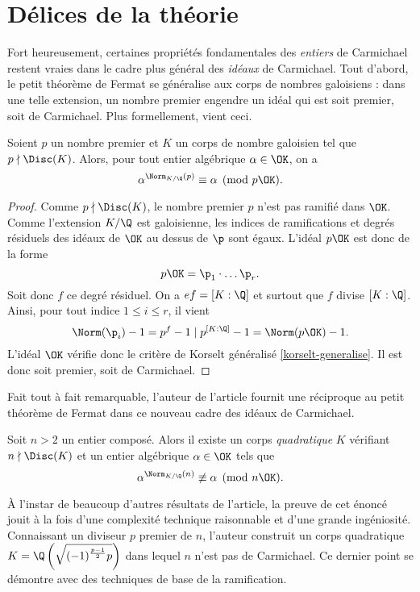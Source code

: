 \section{Délices de la théorie}

Fort heureusement, certaines propriétés fondamentales des \emph{entiers} de Carmichael restent vraies dans le cadre plus général des \emph{idéaux} de Carmichael. Tout d'abord, le petit théorème de Fermat se généralise aux corps de nombres galoisiens : dans une telle extension, un nombre premier engendre un idéal qui est soit premier, soit de Carmichael. Plus formellement, vient ceci.
\begin{theoreme}
	Soient $p$ un nombre premier et $K$ un corps de nombre galoisien tel que $p\nmid \Disc(K)$. Alors, pour tout entier algébrique $\alpha \in \OK$, on a $$\alpha^{\Norm_{K/\Q}(p)} \equiv \alpha \pmod{p\OK}.$$
\end{theoreme}

\begin{proof}
	Comme $p\nmid \Disc(K)$, le nombre premier $p$ n'est pas ramifié dans $\OK$. Comme l'extension $K/\Q$ est galoisienne, les indices de ramifications et degrés résiduels des idéaux de $\OK$ au dessus de $\p$ sont égaux. L'idéal $p\OK$ est donc de la forme \[p\OK = \p_1\cdot \dots \p_r.\] Soit donc $f$ ce degré résiduel. On a $ef = [K : \Q]$ et surtout que $f$ divise $[ K : \Q ]$. Ainsi, pour tout indice $1\leq i \leq r$, il vient \[ \Norm(\p_i) - 1 = p^f - 1 \mid p^{[K : \Q]} - 1 = \Norm(p\OK) - 1.\] L'idéal $\OK$ vérifie donc le critère de Korselt généralisé \ref{korselt-generalise}. Il est donc soit premier, soit de Carmichael.
\end{proof}

Fait tout à fait remarquable, l'auteur de l'article fournit une réciproque au petit théorème de Fermat dans ce nouveau cadre des idéaux de Carmichael.

\begin{theoreme}
	Soit $n>2$ un entier composé. Alors il existe un corps \emph{quadratique} $K$ vérifiant $n\nmid \Disc(K)$ et un entier algébrique $\alpha \in \OK$ tels que $$\alpha^{\Norm_{K/\Q}(n)} \not\equiv \alpha \pmod{n\OK}.$$
\end{theoreme}

\begin{MotSurPreuve}
	À l'instar de beaucoup d'autres résultats de l'article, la preuve de cet énoncé jouit à la fois d'une complexité technique raisonnable et d'une grande ingéniosité. Connaissant un diviseur $p$ premier de $n$, l'auteur construit un corps quadratique $K = \Q\left(\sqrt{(-1)^\frac{p-1}{2} p}\right)$ dans lequel $n$ n'est pas de Carmichael. Ce dernier point se démontre avec des techniques de base de la ramification. \\
\end{MotSurPreuve}

